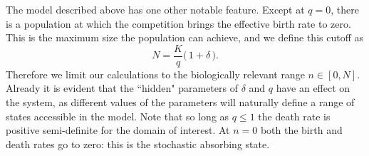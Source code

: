 The model described above has one other notable feature.
Except at $q=0$, there is a population at which the competition brings the effective birth rate to zero.
This is the maximum size the population can achieve, and we define this cutoff as
\begin{equation}
N = \frac{K}{q}\Big(\,1 + \delta\,\Big).
\label{maxN}
\end{equation}
Therefore we limit our calculations to the biologically relevant range $n\in[0,N]$. %
Already it is evident that the ``hidden" parameters of $\delta$ and $q$ have an effect on the system, as different values of the parameters will naturally define a range of states accessible in the model.
Note that so long as $q\leq 1$ the death rate is positive semi-definite for the domain of interest. %
At $n=0$ both the birth and death rates go to zero: this is the stochastic absorbing state.
